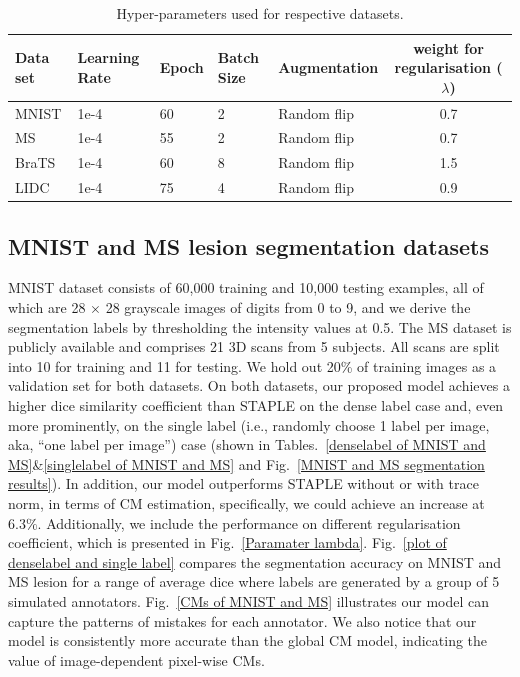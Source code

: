 \begin{table}[!h]
	\center
	\footnotesize
	\begin{tabular}{@{}lllllc}
		\hline
		 Data set & Learning Rate & Epoch & Batch Size & Augmentation & weight for regularisation ($\lambda$) \\
		\hline	
		MNIST  & 1e-4  & 60 & 2 & Random flip & 0.7 \\
		MS & 1e-4 & 55  & 2 & Random flip & 0.7\\
		BraTS & 1e-4 & 60 & 8 & Random flip & 1.5 \\
		LIDC & 1e-4  & 75 & 4 & Random flip & 0.9 \\
		\hline
	\end{tabular}%
\caption{\footnotesize Hyper-parameters used for respective datasets.}
\label{Experiments_settings}
\end{table}


\subsection{MNIST and MS lesion segmentation datasets}
MNIST dataset consists of 60,000 training and 10,000 testing examples, all of which are 28 $\times$ 28 grayscale images of digits from 0 to 9, and we derive the segmentation labels by thresholding the intensity values at 0.5. The MS dataset is publicly available and comprises 21 3D scans from 5 subjects. All scans are split into 10 for training and 11 for testing. We hold out 20\% of training images as a validation set for both datasets. On both datasets, our proposed model achieves a higher dice similarity coefficient than STAPLE on the dense label case and, even more prominently, on the single label (i.e., randomly choose 1 label per image, aka, ``one label per image'') case (shown in Tables.~\ref{denselabel of MNIST and MS}\&\ref{singlelabel of MNIST and MS} and Fig.~\ref{MNIST and MS segmentation results}). In addition, our model outperforms STAPLE without or with trace norm, in terms of CM estimation, specifically, we could achieve an increase at $6.3\%$. Additionally, we include the performance on different regularisation coefficient, which is presented in Fig.~\ref{Paramater lambda}. Fig.~\ref{plot of denselabel and single label} compares the segmentation accuracy on MNIST and MS lesion for a range of average dice where labels are generated by a group of 5 simulated annotators. Fig.~\ref{CMs of MNIST and MS} illustrates our model can capture the patterns of mistakes for each annotator. We also notice that our model is consistently more accurate than the global CM model, indicating the value of image-dependent pixel-wise CMs. 


